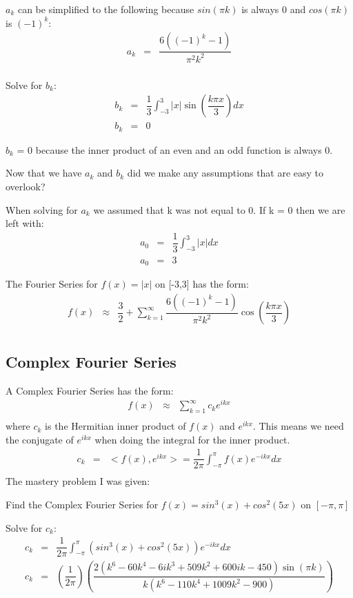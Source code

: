 \documentclass{article}
\newcommand{\bea}{\begin{eqnarray*}}
\newcommand{\eea}{\end{eqnarray*}}
\newcommand{\blue}[1]{\textcolor{blue}{#1}}
\begin{document}
$a_k$ can be simplified to the following because $sin(\pi k)$ is always 0 and $cos(\pi k)$ is $(-1)^k$:
\bea
a_k &=& \dfrac{6((-1)^k-1)}{\pi^2 k^2}\\
\eea

Solve for $b_k$:
\bea
b_k &=& \dfrac{1}{3}\int_{-3}^{3} |x|\sin\left(\dfrac{k \pi x}{3}\right)dx\\
b_k &=& 0
\eea

$b_k$ = 0 because the inner product of an even and an odd function is always 0.\newline 

Now that we have $a_k$ and $b_k$ did we make any assumptions that are easy to overlook?\newline

When solving for $a_k$ we assumed that k was not equal to 0. If k = 0 then we are left with:
\bea
a_0 &=& \dfrac{1}{3}\int_{-3}^{3} |x|dx\\
a_0 &=& 3
\eea

The Fourier Series for $f(x) = |x|$ on [-3,3] has the form:
\bea
f(x) &\approx& \dfrac{3}{2}+\sum_{k=1}^{\infty} \dfrac{6((-1)^k-1)}{\pi^2 k^2}\cos\left(\dfrac{k \pi x}{3}\right) \\
\eea

\subsection{Complex Fourier Series}
A Complex Fourier Series has the form:
\bea
f(x) &\approx& \sum_{k=1}^{\infty} c_ke^{ikx} \\
\eea
where $c_k$ is the Hermitian inner product of $f(x)$ and $e^{ikx}$. This means we need the conjugate of $e^{ikx}$ when doing the integral for the inner product.
\bea
c_k &=& <f(x),e^{ikx}> = \dfrac{1}{2\pi}\int_{-\pi}^{\pi} f(x)e^{-ikx}dx \\
\eea
The mastery problem I was given: \newline

Find the Complex Fourier Series for $f(x) = sin^3(x)+cos^2(5x)$ on $[-\pi,\pi]$

Solve for $c_k$:
\bea
c_k &=& \dfrac{1}{2\pi}\int_{-\pi}^{\pi} (sin^3(x)+cos^2(5x))e^{-ikx}dx\\
c_k &=& \left(\dfrac{1}{2\pi}\right)\left(\dfrac{2(k^6-60k^4-6ik^3+509k^2+600ik-450)\sin(\pi k)}{k(k^6-110k^4+1009k^2-900)}\right)\\
\eea
\end{document}
